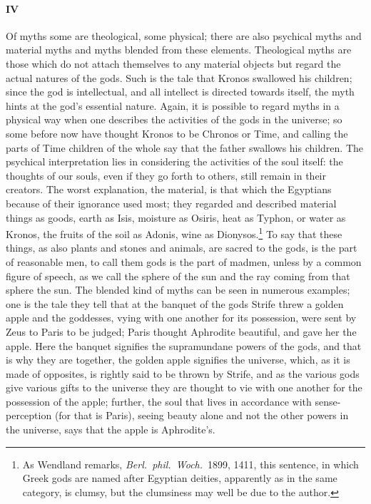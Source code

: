 \documentclass[12pt]{article}
\begin{document}
\paragraph{IV} Of myths some are theological, some physical; there are
also psychical myths and material myths and myths blended
from these elements. Theological myths are those which
do not attach themselves to any material objects but regard
the actual natures of the gods. Such is the tale that Kronos
swallowed his children; since the god is intellectual, and all
intellect is directed towards itself, the myth hints at the
god's essential nature. Again, it is possible to regard myths
in a physical way when one describes the activities of the
gods in the universe; so some before now have thought
Kronos to be Chronos or Time, and calling the parts of Time
children of the whole say that the father swallows his
children. The psychical interpretation lies in considering
the activities of the soul itself: the thoughts of our souls,
even if they go forth to others, still remain in their creators.
The worst explanation, the material, is that which the
Egyptians because of their ignorance used most; they
regarded and described material things as goods, earth as
Isis, moisture as Osiris, heat as Typhon, or water as Kronos,
the fruits of the soil as Adonis, wine as Dionysos.\footnote{As Wendland
remarks, \textit{Berl.~phil.~Woch.}~1899, 1411, this sentence,
in which Greek gods are named after Egyptian deities, apparently as
in the same category, is clumsy, but the clumsiness may well be due
to the author.} To say
that these things, as also plants and stones and animals, are
sacred to the gods, is the part of reasonable men, to call
them gods is the part of madmen, unless by a common
figure of speech, as we call the sphere of the sun and the ray
coming from that sphere the sun. The blended kind of
myths can be seen in numerous examples; one is the tale
they tell that at the banquet of the gods Strife threw a
golden apple and the goddesses, vying with one another for
its possession, were sent by Zeus to Paris to be judged;
Paris thought Aphrodite beautiful, and gave her the apple.
Here the banquet signifies the supramundane powers of the
gods, and that is why they are together, the golden apple
signifies the universe, which, as it is made of opposites, is
rightly said to be thrown by Strife, and as the various gods
give various gifts to the universe they are thought to vie
with one another for the possession of the apple; further, the
soul that lives in accordance with sense-perception (for that
is Paris), seeing beauty alone and not the other powers in
the universe, says that the apple is Aphrodite's.
\end{document}

